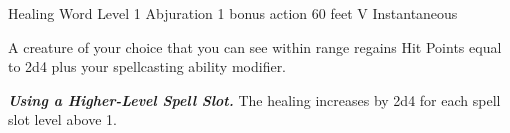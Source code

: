 \DndSpellHeader%
    {Healing Word}
    {Level 1 Abjuration}
    {1 bonus action}
    {60 feet}
    {V}
    {Instantaneous}

A creature of your choice that you can see within range regains Hit Points equal to 2d4 plus your spellcasting ability modifier.

\textbf{\textit{Using a Higher-Level Spell Slot.}} The healing increases by 2d4 for each spell slot level above 1.
